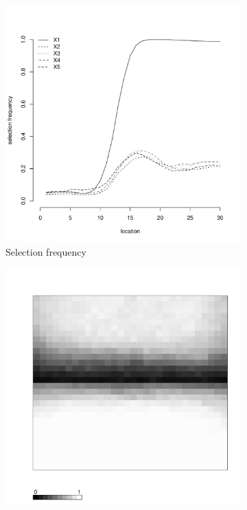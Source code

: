 \documentclass[authoryear, review, 11pt]{elsarticle}
\begin{document}
\begin{figure}
\begin{subfigure}[b]{0.45\textwidth}
		\includegraphics[width=\textwidth]{../../figures/simulation/15.7.profile_selection.pdf}
		\caption{Selection frequency}
	\end{subfigure}
	\begin{subfigure}[b]{0.45\textwidth}
	\centering
		\includegraphics[width=\textwidth]{../../figures/simulation/X1.15.7.unshrunk_bootstrap_coverage.pdf}

\end{subfigure}
\end{figure}
\end{document}
